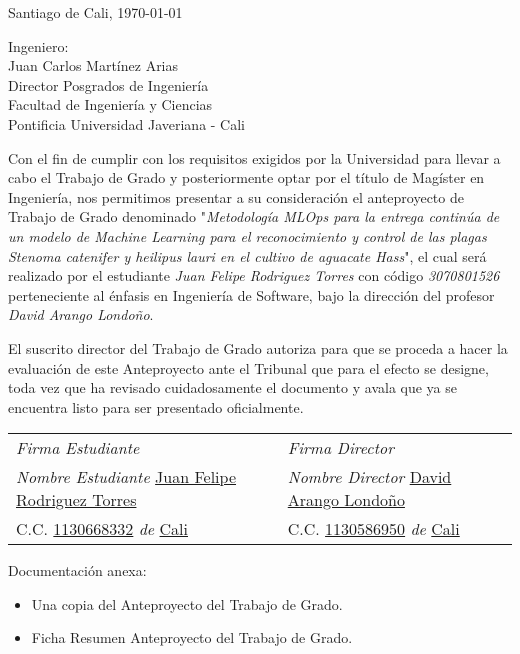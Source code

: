 \thispagestyle{empty}
Santiago de Cali, \today

\newcommand{\underlinetext}[2][1pt]{{%
  \renewcommand{\ULdepth}{#1}%
  \uline{#2}%
}}

\begin{flushleft}
Ingeniero: \\
Juan Carlos Martínez Arias \\
Director Posgrados de Ingeniería \\
Facultad de Ingeniería y Ciencias \\
Pontificia Universidad Javeriana - Cali \\
\end{flushleft}


Con el fin de cumplir con los requisitos exigidos por la Universidad para llevar a cabo el Trabajo de Grado y posteriormente optar por el título de Magíster en Ingeniería, nos permitimos presentar a su consideración el anteproyecto de Trabajo de Grado denominado "\textit{Metodología MLOps para la entrega continúa de un modelo de Machine Learning para el reconocimiento y control de las plagas Stenoma catenifer y heilipus lauri en el cultivo de aguacate Hass}", el cual será realizado por el estudiante \textit{Juan Felipe Rodriguez Torres} con código \textit{3070801526} perteneciente al énfasis en Ingeniería de Software, bajo la dirección del profesor \textit{David Arango Londoño}.

El suscrito director del Trabajo de Grado autoriza para que se proceda a hacer la evaluación de este Anteproyecto ante el Tribunal que para el efecto se designe, toda vez que ha revisado cuidadosamente el documento y avala que ya se encuentra listo para ser presentado oficialmente.

\vspace{1cm}

\begin{table}[h]
\begin{tabular}{@{}p{} p{}@{}}
\textit{Firma Estudiante} \hrulefill & \textit{Firma Director} \hrulefill \\
\textit{Nombre Estudiante} \underlinetext[1pt]{Juan Felipe Rodriguez Torres} & \textit{Nombre Director} \underline{David Arango Londoño} \\
C.C. \underline{1130668332} \textit{de} \underline{Cali} & C.C. \underline{1130586950} \textit{de} \underline{Cali} \\
\end{tabular}
\end{table}

\vspace{1cm}

Documentación anexa:

\begin{itemize}
  \item Una copia del Anteproyecto del Trabajo de Grado.
  \item Ficha Resumen Anteproyecto del Trabajo de Grado.
\end{itemize}
